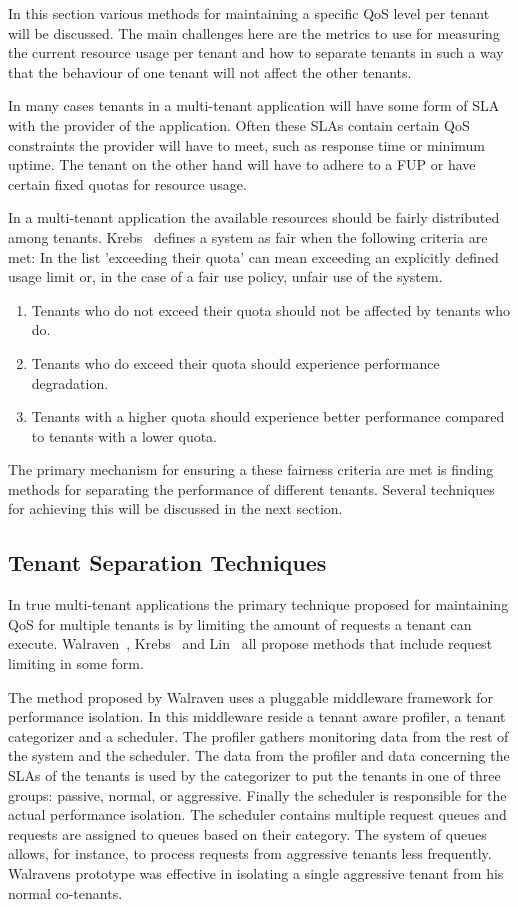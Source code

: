 In this section various methods for maintaining a specific \ac{QoS} level per tenant will be discussed.
The main challenges here are the metrics to use for measuring the current resource usage per tenant and how to separate tenants in such a way that the behaviour of one tenant will not affect the other tenants.~\cite{krebs2013metrics}

In many cases tenants in a multi-tenant application will have some form of \ac{SLA} with the provider of the application.
Often these SLAs contain certain \ac{QoS} constraints the provider will have to meet, such as response time or minimum uptime. 
The tenant on the other hand will have to adhere to a \ac{FUP} or have certain fixed quotas for resource usage.

In a multi-tenant application the available resources should be fairly distributed among tenants.
Krebs~\cite{krebs2013metrics} defines a system as fair when the following criteria are met:
In the list 'exceeding their quota' can mean exceeding an explicitly defined usage limit or, in the case of a fair use policy, unfair use of the system.
\begin{enumerate}
	\item Tenants who do not exceed their quota should not be affected by tenants who do.
	\item Tenants who do exceed their quota should experience performance degradation. 
	\item Tenants with a higher quota should experience better performance compared to tenants with a lower quota.
\end{enumerate}

The primary mechanism for ensuring a these fairness criteria are met is finding methods for separating the performance of different tenants.
Several techniques for achieving this will be discussed in the next section.

\subsection{Tenant Separation Techniques}
In true multi-tenant applications the primary technique proposed for maintaining \ac{QoS} for multiple tenants is by limiting the amount of requests a tenant can execute. Walraven~\cite{walraven2012towards}, Krebs~\cite{krebs2013metrics} and Lin~\cite{lin2009feedback} all propose methods that include request limiting in some form.

The method proposed by Walraven uses a pluggable middleware framework for performance isolation.
In this middleware reside a tenant aware profiler, a tenant categorizer and a scheduler. 
The profiler gathers monitoring data from the rest of the system and the scheduler.
The data from the profiler and data concerning the \acp{SLA} of the tenants is used by the categorizer to put the tenants in one of three groups: passive, normal, or aggressive.
Finally the scheduler is responsible for the actual performance isolation.
The scheduler contains multiple request queues and requests are assigned to queues based on their category.
The system of queues allows, for instance, to process requests from aggressive tenants less frequently.
Walravens prototype was effective in isolating a single aggressive tenant from his normal co-tenants.

